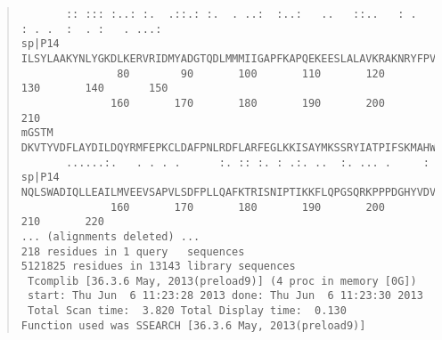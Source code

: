 \begin{footnotesize}
\begin{quote}
\begin{verbatim}
       :: ::: :..: :.  .::.: :.  . ..:  :..:   ..   ::..   : .   : . .  :  . :   . ...:
sp|P14 ILSYLAAKYNLYGKDLKERVRIDMYADGTQDLMMMIIGAPFKAPQEKEESLALAVKRAKNRYFPVFEKILKDHGEAFLVG
               80        90       100       110       120       130       140       150
              160       170       180       190       200       210            
mGSTM  DKVTYVDFLAYDILDQYRMFEPKCLDAFPNLRDFLARFEGLKKISAYMKSSRYIATPIFSKMAHWSNK    
       ......:.   . . . .      :. :: :. : .:. ..  :. ... .     :               
sp|P14 NQLSWADIQLLEAILMVEEVSAPVLSDFPLLQAFKTRISNIPTIKKFLQPGSQRKPPPDGHYVDVVRTVLKF
              160       170       180       190       200       210       220  
... (alignments deleted) ...
218 residues in 1 query   sequences
5121825 residues in 13143 library sequences
 Tcomplib [36.3.6 May, 2013(preload9)] (4 proc in memory [0G])
 start: Thu Jun  6 11:23:28 2013 done: Thu Jun  6 11:23:30 2013
 Total Scan time:  3.820 Total Display time:  0.130
Function used was SSEARCH [36.3.6 May, 2013(preload9)]
\end{verbatim}
\end{quote}
\end{footnotesize}
\vspace{-4.0ex}
